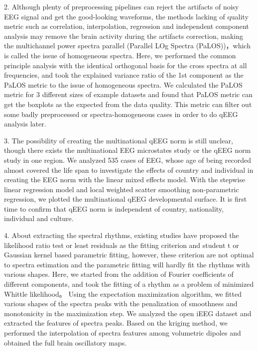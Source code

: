 \begin{englishabstract}
2. Although plenty of preprocessing pipelines can reject the artifacts of noisy EEG signal and get the good-looking waveforms, the methods lacking of quality metric such as correlation, interpolation, regression and independent component analysis may remove the brain activity during the artifacts correction, making the multichannel power spectra parallel (Parallel LOg Spectra (PaLOS))，which is called the issue of homogeneous spectra. Here, we performed the common principle analysis with the identical orthogonal basis for the cross spectra at all frequencies, and took the explained variance ratio of the 1st component as the PaLOS metric to the issue of homogeneous spectra. We calculated the PaLOS metric for 3 different sizes of example datasets and found that PaLOS metric can get the boxplots as the expected from the data quality. This metric can filter out some badly preprocessed or spectra-homogeneous cases in order to do qEEG analysis later.

3. The possibility of creating the multinational qEEG norm is still unclear, though there exists the multinational EEG microstates study or the qEEG norm study in one region. We analyzed 535 cases of EEG, whose age of being recorded almost covered the life span to investigate the effects of country and individual in creating the EEG norm with the linear mixed effects model. With the stepwise linear regression model and local weighted scatter smoothing non-parametric regression, we plotted the multinational qEEG developmental surface. It is first time to confirm that qEEG norm is independent of country, nationality, individual and culture.

4. About extracting the spectral rhythms, existing studies have proposed the likelihood ratio test or least residuals as the fitting criterion and student t or Gaussian kernel based parametric fitting, however, these criterion are not optimal to spectra estimation and the parametric fitting will hardly fit the rhythms with various shapes. Here, we started from the addition of Fourier coefficients of different components, and took the fitting of a rhythm as a problem of minimized Whittle likelihood。 Using the expectation maximization algorithm, we fitted various shapes of the spectra peaks with the penalization of smoothness and monotonicity in the maximization step. We analyzed the open iEEG dataset and extracted the features of spectra peaks. Based on the kriging method, we performed the interpolation of spectra features among volumetric dipoles and obtained the full brain oscillatory maps.


\end{englishabstract}
